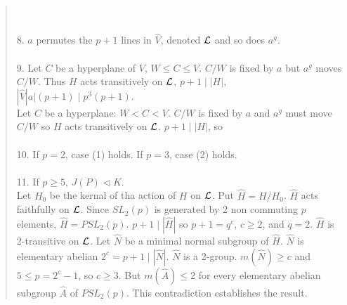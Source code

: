 \begin{quote}
\\
\\
8. $a$ permutes the $p+1$ lines in ${\hat V}$, denoted ${\cal L}$ and so does $a^g$.
\\
\\
9. Let $C$ be a hyperplane of $V$, $W \leq C \leq V$. $C/W$ is fixed by $a$ but $a^g$ moves $C/W$.  Thus $H$ acts transitively
on ${\cal L}$, $p+1 \mid |H|$, $|{\hat V} |a| (p+1) \mid p^3 (p+1)$.\\
Let $C$ be a hyperplane: $W < C < V$.  $C/W$ is fixed by $a$ and $a^g$
must move $C/W$ so $H$ acts transitively on ${\cal L}$.  $p+1 \mid |H|$, so
\\
\\
10. If $p=2$, case (1) holds.  If $p=3$, case (2) holds.
\\
\\
11. If $p\geq 5$, $J(P) \lhd K$.\\
Let $H_0$ be the kernal of tha action of $H$ on ${\cal L}$. Put ${\hat H} = H/H_0$. ${\hat H}$ acts faithfully on ${\cal L}$.
Since $SL_2(p)$ is generated by 2 non commuting $p$ elements, ${\hat H} = PSL_2(p)$.   $p+1 \mid |{\hat H}|$ so $p+1=q^c$, $c \geq 2$,
and $q=2$.
${\hat H}$ is 2-transitive on ${\cal L}$.  Let ${\hat N}$ be a minimal normal subgroup of ${\hat H}$.  ${\hat N}$ is elementary
abelian $2^c=p+1 \mid |{\hat N}|$. ${\hat N}$ is a 2-group. $m({\hat N}) \geq c$ and
$5 \leq p= 2^c-1$, so $c \geq 3$.  But $m({\hat A}) \leq 2$ for every elementary abelian subgroup ${\hat A}$ of $PSL_2(p)$.  This contradiction
establishes the result.
\end{quote}
